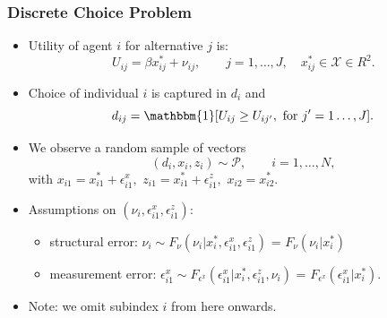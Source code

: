 \documentclass[10pt,letterpaper]{beamer}
\begin{document}
\begin{frame}
\frametitle{Discrete Choice Problem}

\begin{itemize}
	\item Utility of agent $i$ for alternative $j$ is:
	\begin{equation*}
	U_{ij}=\beta x^{*}_{ij} + \nu_{ij},\qquad  j = 1,\dots,J,\quad x^{*}_{ij}\in\mathcal{X}\in R^{2}.
	\end{equation*}
	\item Choice of individual $i$ is captured in $d_{i}$ and
	\begin{equation*}
	d_{ij} = \mathbbm{1}[U_{ij}\geq U_{ij'},\text{ for $j'=1\dots,J$}].
	\end{equation*}
	\item We observe a random sample of vectors
	\begin{equation*}
	(d_{i},x_{i},z_{i})\sim\mathcal{P},\qquad i = 1,\dots,N,
	\end{equation*}
	with $x_{i1}=x^{*}_{i1}+\epsilon^{x}_{i1},$ $z_{i1}=x^{*}_{i1} + \epsilon^{z}_{i1},$ $x_{i2}=x^{*}_{i2}$.
	\item Assumptions on $(\nu_{i},\epsilon^{x}_{i1},\epsilon^{z}_{i1})$:
	\begin{itemize}
	\item structural error: $\nu_{i}\sim F_{\nu}(\nu_{i}|x_{i}^{*},\epsilon_{i1}^{x},\epsilon_{i1}^{z})$ = $F_{\nu}(\nu_{i}|x_{i}^{*})$
	\item measurement error: $\epsilon^{x}_{i1}\sim F_{\epsilon^{x}}(\epsilon_{i1}^{x}|x_{i}^{*},\epsilon_{i1}^{z},\nu_{i})$ = $F_{\epsilon^{x}}(\epsilon_{i1}^{x}|x_{i}^{*})$.
	\end{itemize}
	\item Note: we omit subindex $i$ from here onwards.
\end{itemize}
\end{frame}
\end{document}
